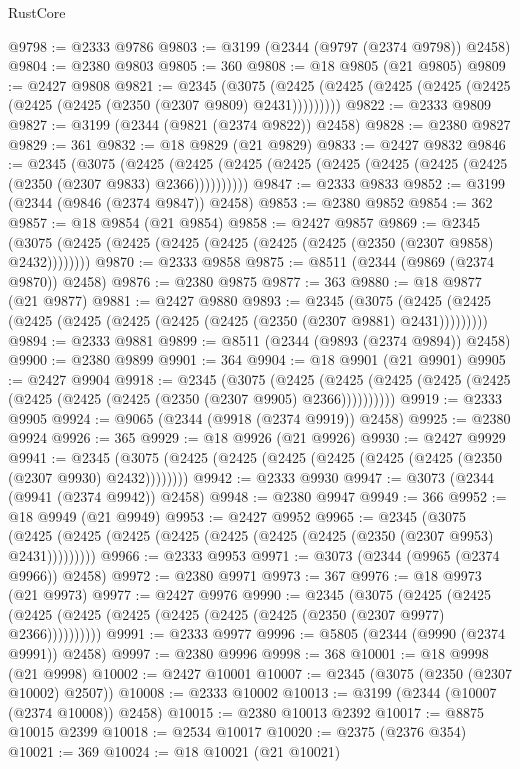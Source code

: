 \begin{lexlean}{RustCore}
\begin{coremodule}
@9798 := @2333 @9786
@9803 := @3199 (@2344 (@9797 (@2374 @9798)) @2458)
@9804 := @2380 @9803
@9805 := 360
@9808 := @18 @9805 (@21 @9805)
@9809 := @2427 @9808
@9821 := @2345
    (@3075 (@2425 (@2425 (@2425 (@2425 (@2425 (@2425 (@2425 (@2350 (@2307 @9809) @2431)))))))))
@9822 := @2333 @9809
@9827 := @3199 (@2344 (@9821 (@2374 @9822)) @2458)
@9828 := @2380 @9827
@9829 := 361
@9832 := @18 @9829 (@21 @9829)
@9833 := @2427 @9832
@9846 := @2345
    (@3075
      (@2425 (@2425 (@2425 (@2425 (@2425 (@2425 (@2425 (@2425 (@2350 (@2307 @9833) @2366))))))))))
@9847 := @2333 @9833
@9852 := @3199 (@2344 (@9846 (@2374 @9847)) @2458)
@9853 := @2380 @9852
@9854 := 362
@9857 := @18 @9854 (@21 @9854)
@9858 := @2427 @9857
@9869 := @2345 (@3075 (@2425 (@2425 (@2425 (@2425 (@2425 (@2425 (@2350 (@2307 @9858) @2432))))))))
@9870 := @2333 @9858
@9875 := @8511 (@2344 (@9869 (@2374 @9870)) @2458)
@9876 := @2380 @9875
@9877 := 363
@9880 := @18 @9877 (@21 @9877)
@9881 := @2427 @9880
@9893 := @2345
    (@3075 (@2425 (@2425 (@2425 (@2425 (@2425 (@2425 (@2425 (@2350 (@2307 @9881) @2431)))))))))
@9894 := @2333 @9881
@9899 := @8511 (@2344 (@9893 (@2374 @9894)) @2458)
@9900 := @2380 @9899
@9901 := 364
@9904 := @18 @9901 (@21 @9901)
@9905 := @2427 @9904
@9918 := @2345
    (@3075
      (@2425 (@2425 (@2425 (@2425 (@2425 (@2425 (@2425 (@2425 (@2350 (@2307 @9905) @2366))))))))))
@9919 := @2333 @9905
@9924 := @9065 (@2344 (@9918 (@2374 @9919)) @2458)
@9925 := @2380 @9924
@9926 := 365
@9929 := @18 @9926 (@21 @9926)
@9930 := @2427 @9929
@9941 := @2345 (@3075 (@2425 (@2425 (@2425 (@2425 (@2425 (@2425 (@2350 (@2307 @9930) @2432))))))))
@9942 := @2333 @9930
@9947 := @3073 (@2344 (@9941 (@2374 @9942)) @2458)
@9948 := @2380 @9947
@9949 := 366
@9952 := @18 @9949 (@21 @9949)
@9953 := @2427 @9952
@9965 := @2345
    (@3075 (@2425 (@2425 (@2425 (@2425 (@2425 (@2425 (@2425 (@2350 (@2307 @9953) @2431)))))))))
@9966 := @2333 @9953
@9971 := @3073 (@2344 (@9965 (@2374 @9966)) @2458)
@9972 := @2380 @9971
@9973 := 367
@9976 := @18 @9973 (@21 @9973)
@9977 := @2427 @9976
@9990 := @2345
    (@3075
      (@2425 (@2425 (@2425 (@2425 (@2425 (@2425 (@2425 (@2425 (@2350 (@2307 @9977) @2366))))))))))
@9991 := @2333 @9977
@9996 := @5805 (@2344 (@9990 (@2374 @9991)) @2458)
@9997 := @2380 @9996
@9998 := 368
@10001 := @18 @9998 (@21 @9998)
@10002 := @2427 @10001
@10007 := @2345 (@3075 (@2350 (@2307 @10002) @2507))
@10008 := @2333 @10002
@10013 := @3199 (@2344 (@10007 (@2374 @10008)) @2458)
@10015 := @2380 @10013 @2392
@10017 := @8875 @10015 @2399
@10018 := @2534 @10017
@10020 := @2375 (@2376 @354)
@10021 := 369
@10024 := @18 @10021 (@21 @10021)

\end{coremodule}
\end{lexlean}
